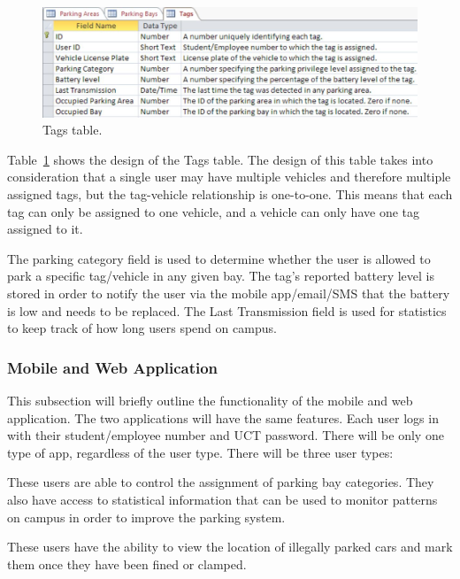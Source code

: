 
\begin{figure}[H]
\begin{center}
\includegraphics[scale=0.5]{data/software/7.jpg}
\caption{Tags table.}
\label{fig:table-tags}
\end{center}
\end{figure}

Table~\ref{fig:table-tags} shows the design of the Tags table. The design of this table takes into consideration that a single user may have multiple vehicles and therefore multiple assigned tags, but the tag-vehicle relationship is one-to-one. This means that each tag can only be assigned to one vehicle, and a vehicle can only have one tag assigned to it.

\newpage
The parking category field is used to determine whether the user is allowed to park a specific tag/vehicle in any given bay. The tag's reported battery level is stored in order to notify the user via the mobile app/email/SMS that the battery is low and needs to be replaced.
The Last Transmission field is used for statistics to keep track of how long users spend on campus.

\subsubsection{Mobile and Web Application}

This subsection will briefly outline the functionality of the mobile and web application. The two applications will have the same features. Each user logs in with their student/employee number and UCT password. There will be only one type of app, regardless of the user type. There will be three user types:

These users are able to control the assignment of parking bay categories. They also have access to statistical information that can be used to monitor patterns on campus in order to improve the parking system.

These users have the ability to view the location of illegally parked cars and mark them once they have been fined or clamped.

